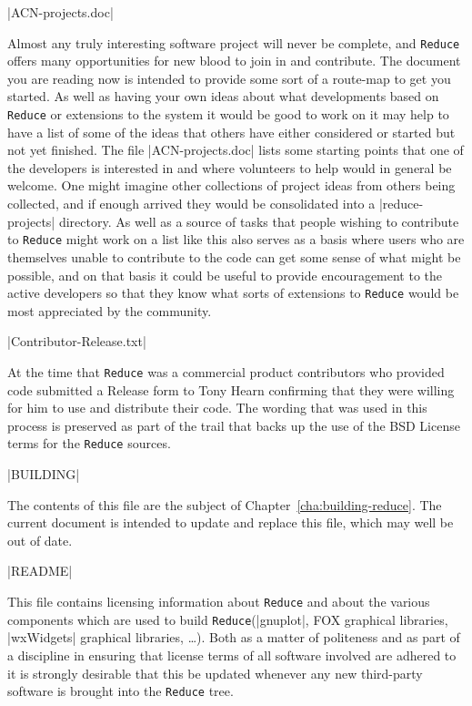 \documentclass[12pt,twoside,openright]{memoir}
\newcommand{\reduce}{\texttt{Reduce}\xspace}
\begin{document}
\begin{description}
  \item |ACN-projects.doc|
    
Almost any truly interesting software project will never be complete, and
\reduce offers many opportunities for new blood to join in and contribute.
The document you are reading now is intended to provide some sort of a
route-map to get you started. As well as having your own ideas about what
developments based on \reduce or extensions to the system it would be good
to work on it may help to have a list of some of the ideas that others
have either considered or started but not yet finished. The file
|ACN-projects.doc| lists some starting points that one of the developers
is interested in and where volunteers to help would in general be
welcome. One might imagine other collections of project ideas from
others being collected, and if enough arrived they would be consolidated
into a |reduce-projects| directory. As well as a source of tasks that
people wishing to contribute to \reduce might work on a list like this
also serves as a basis where users who are themselves unable to contribute
to the code can get some sense of what might be possible, and on that
basis it could be useful to provide encouragement to the active developers
so that they know what sorts of extensions to \reduce would be most
appreciated by the community.

  \item |Contributor-Release.txt|

At the time that \reduce was a commercial product contributors who provided
code submitted a Release form to Tony Hearn confirming that they were willing
for him to use and distribute their code. The wording that was used in this
process is preserved as part of the trail that backs up the use of the
BSD License terms for the \reduce sources.

  \item |BUILDING|

    The contents of this file are the subject of
    Chapter~\ref{cha:building-reduce}. The current document is intended to
    update and replace this file, which may well be out of date.

  \item |README|

    This file contains licensing information about \reduce and about the
    various components which are used to build \reduce (|gnuplot|, FOX
    graphical libraries, |wxWidgets| graphical libraries, \dots). Both
    as a matter of politeness and as part of a discipline in ensuring that
    license terms of all software involved are adhered to it is strongly
    desirable that this be updated whenever any new third-party software is
    brought into the \reduce tree.
\end{description}
\end{document}
